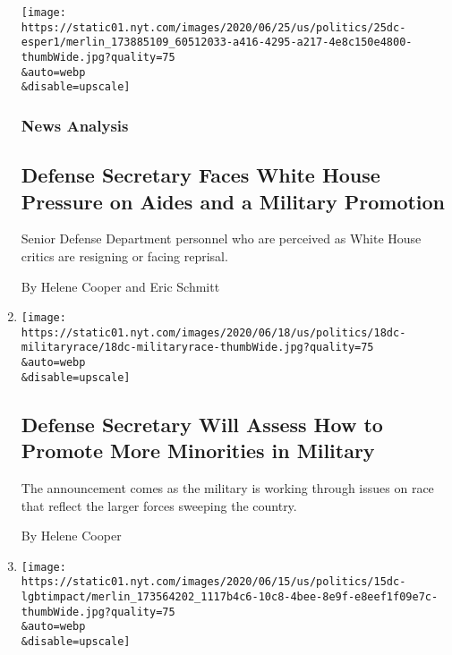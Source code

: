 \begin{enumerate}
  \texttt{[image: https://static01.nyt.com/images/2020/06/25/us/politics/25dc-esper1/merlin\_173885109\_60512033-a416-4295-a217-4e8c150e4800-thumbWide.jpg?quality=75\\\&auto=webp\\\&disable=upscale]}

  \hypertarget{news-analysis}{%
  \subsubsection{News Analysis}\label{news-analysis}}

  \hypertarget{defense-secretary-faces-white-house-pressure-on-aides-and-a-military-promotion}{%
  \subsection{Defense Secretary Faces White House Pressure on Aides and
  a Military
  Promotion}\label{defense-secretary-faces-white-house-pressure-on-aides-and-a-military-promotion}}

  Senior Defense Department personnel who are perceived as White House
  critics are resigning or facing reprisal.

  By Helene Cooper and Eric Schmitt
\item
  \href{/2020/06/18/us/politics/esper-military-race.html}{}

  \texttt{[image: https://static01.nyt.com/images/2020/06/18/us/politics/18dc-militaryrace/18dc-militaryrace-thumbWide.jpg?quality=75\\\&auto=webp\\\&disable=upscale]}

  \hypertarget{defense-secretary-will-assess-how-to-promote-more-minorities-in-military}{%
  \subsection{Defense Secretary Will Assess How to Promote More
  Minorities in
  Military}\label{defense-secretary-will-assess-how-to-promote-more-minorities-in-military}}

  The announcement comes as the military is working through issues on
  race that reflect the larger forces sweeping the country.

  By Helene Cooper
\item
  \href{/2020/06/15/upshot/transgender-rights-trump.html}{}

  \texttt{[image: https://static01.nyt.com/images/2020/06/15/us/politics/15dc-lgbtimpact/merlin\_173564202\_1117b4c6-10c8-4bee-8e9f-e8eef1f09e7c-thumbWide.jpg?quality=75\\\&auto=webp\\\&disable=upscale]}

  \hypertarget{supreme-court-expansion-of-transgender-rights-undercuts-trump-restrictions}{%
}
\end{enumerate}
